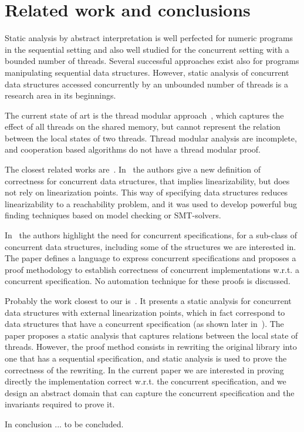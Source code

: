 \section{Related work and conclusions}

Static analysis by abstract interpretation is well perfected for numeric programs in the sequential setting and also well studied for the concurrent setting with a bounded number of threads. 
Several successful approaches exist also for programs manipulating  sequential data structures\cite{}. 
However, static analysis of concurrent data structures accessed concurrently by an unbounded number of threads is a research area in its beginnings. 

The current state of art is the thread modular approach~\cite{threadmodular, VV1}, which  captures the effect of all threads on the shared memory, but cannot represent the relation between the local states of two threads.  Thread modular analysis are incomplete, and cooperation based algorithms do not have a thread modular proof. 

The closest related works are~\cite{cav13,ee1,ee2,ee3,disc15,mine17}. 
In~\cite{ee1,ee2,ee3} the authors give a new definition of correctness for concurrent data structures, that implies linearizability, but does not rely on linearization points.  This way of specifying data structures  reduces linearizability to a reachability problem, and it was used to develop powerful bug finding techniques based on model checking or SMT-solvers. 

In~\cite{disc15} the authors highlight the need for concurrent specifications, for a sub-class of concurrent data structures, including some of the structures we are interested in. The paper defines a language to express concurrent specifications and proposes a proof methodology to establish correctness of concurrent implementations w.r.t. a concurrent specification.  No automation technique for these proofs is discussed.  

Probably the work closest to our is~\cite{cav13}. It presents a static analysis for concurrent data structures with external linearization points, which in fact correspond to data structures that have a concurrent specification (as shown later in~\cite{disc15}).  
The paper proposes a static analysis that captures relations between the local state of threads.  
However, the proof method consists in rewriting the original library into one that has a sequential specification, and static analysis is used to prove the correctness of the rewriting. In the current paper we are interested in proving directly the implementation correct w.r.t. the concurrent specification, and we design an abstract domain that can capture the concurrent specification and the invariants required to prove it. 

In conclusion ... to be concluded. 
